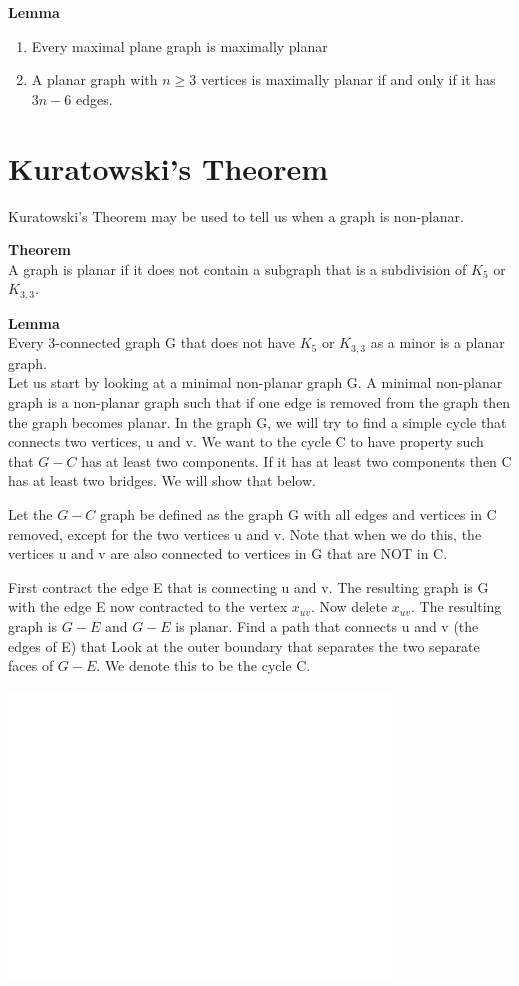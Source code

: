 \textbf{Lemma}\\
\begin{enumerate}
\item{Every maximal plane graph is maximally planar}
\item{A planar graph with $n\geq 3$ vertices is maximally planar if and only if it has $3n-6$ edges.}
\end{enumerate}


\section{Kuratowski's Theorem}
Kuratowski's Theorem may be used to tell us when a graph is non-planar. 

\textbf{Theorem}\\
A graph is planar if it does not contain a subgraph that is a subdivision of $K_5$ or $K_{3,3}$.  

\textbf{Lemma}\\
Every 3-connected graph G that does not have $K_5$ or $K_{3,3}$ as a minor is a planar graph.
\\
Let us start by looking at a minimal non-planar graph G. A minimal non-planar graph is a non-planar graph such that if one edge is removed from the graph then the graph becomes planar. In the graph G, we will try to find a simple cycle that connects two vertices, u and v.  We want to the cycle C to have property such that $G - C$ has at least two components.  If it has at least two components then C has at least two bridges. We will show that below. 

Let the $G - C$ graph be defined as the graph G with all edges and vertices in C removed, except for the two vertices u and v.  Note that when we do this, the vertices u and v are also connected to vertices in G that are NOT in C.
 
First contract the edge E that is connecting u and v. The resulting graph is G~ with the edge E now contracted to the vertex $x_{uv}$. Now delete $x_{uv}$. The resulting graph is $G - E$ and $G - E$ is planar. Find a path that connects u and v (the edges of E) that  Look at the outer boundary that separates the two separate faces of $G - E$. We denote this to be the cycle C.

\includegraphics[height = 3in]{white.png}

